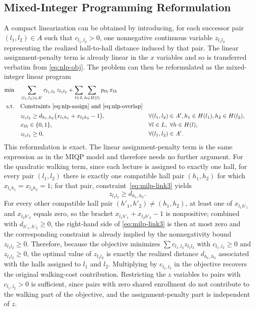 \documentclass[11pt]{article}
\begin{document}
\subsection{Mixed-Integer Programming Reformulation}
\label{subsec:milp-formulation}
A compact linearization can be obtained by introducing, for each successor pair $(l_1,l_2) \in A$ such that $c_{l_1,l_2} > 0$, one nonnegative continuous variable $z_{l_1 l_2}$ representing the realized hall-to-hall distance induced by that pair. The linear assignment-penalty term is already linear in the $x$ variables and so is transferred verbatim from \eqref{eq:nlp-obj}. The problem can then be reformulated as the mixed-integer linear program
\begin{align}
    \min \quad & \sum_{(l_1,l_2) \in A'} c_{l_1,l_2}\, z_{l_1 l_2}
    + \sum_{l \in L} \sum_{h \in H(l)} p_{lh}\, x_{lh} \label{eq:milp-obj} \\
    \text{s.t.}  \quad &   \text{Constraints \eqref{eq:nlp-assign} and \eqref{eq:nlp-overlap}} \nonumber\\
   & z_{l_1 l_2} \ge d_{h_1,h_2}\bigl(x_{l_1 h_1} + x_{l_2 h_2} - 1\bigr), && \forall (l_1,l_2) \in A',  h_1 \in H(l_1), h_2 \in H(l_2), \label{eq:milp-link3} \\
   & x_{lh} \in \{0,1\}, && \forall l \in L,\ \forall h \in H(l), \label{eq:milp-x-binary} \\
    & z_{l_1 l_2} \ge 0, && \forall (l_1,l_2) \in A'. \label{eq:milp-z-nonneg}
\end{align}
This reformulation is exact. The linear assignment-penalty term is the same expression as in the MIQP model and therefore needs no further argument. For the quadratic walking term, since each lecture is assigned to exactly one hall, for every pair $(l_1,l_2)$ there is exactly one compatible hall pair $(h_1,h_2)$ for which $x_{l_1 h_1}=x_{l_2 h_2}=1$; for that pair, constraint~\eqref{eq:milp-link3} yields
\[
z_{l_1 l_2} \ge d_{h_1,h_2}.
\]
For every other compatible hall pair $(h'_1,h'_2)\neq (h_1,h_2)$, at least one of $x_{l_1 h'_1}$ and $x_{l_2 h'_2}$ equals zero, so the bracket $x_{l_1 h'_1}+x_{l_2 h'_2}-1$ is nonpositive; combined with $d_{h'_1,h'_2}\ge 0$, the right-hand side of \eqref{eq:milp-link3} is then at most zero and the corresponding constraint is already implied by the nonnegativity bound $z_{l_1 l_2} \ge 0$. Therefore, because the objective minimizes $\sum c_{l_1,l_2} z_{l_1 l_2}$ with $c_{l_1,l_2}\ge 0$ and $z_{l_1 l_2}\ge 0$, the optimal value of $z_{l_1 l_2}$ is exactly the realized distance $d_{h_1,h_2}$ associated with the halls assigned to $l_1$ and $l_2$. Multiplying by $c_{l_1,l_2}$ in the objective recovers the original walking-cost contribution. Restricting the $z$ variables to pairs with $c_{l_1,l_2} > 0$ is sufficient, since pairs with zero shared enrollment do not contribute to the walking part of the objective, and the assignment-penalty part is independent of $z$.
\end{document}
